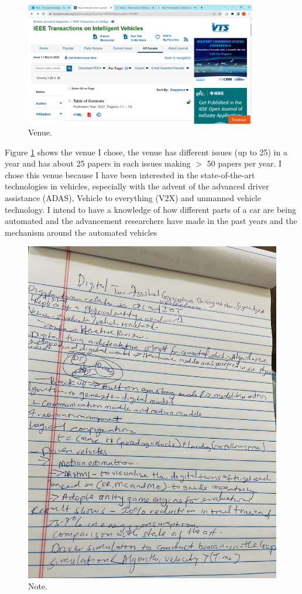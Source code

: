 \documentclass{article}
\begin{document}
\begin{figure}[htbp]
  \centering
  \includegraphics[width=0.9\textwidth]{Screenshot (280).png}
  \caption{Venue.}
  \label{fig:venue}
  \end{figure}
Figure \ref{fig:venue} shows the venue \cite{conference} I chose, the venue has different issues (up to 25) in a year and has about 25 papers in each issues making $>$ 50 papers per year. I chose this venue because I have been interested in the state-of-the-art technologies in vehicles, especially with the advent of the advanced driver assistance (ADAS), Vehicle to everything (V2X) and unmanned vehicle technology. I intend to have a knowledge of how different parts of a car are being automated and the advancement researchers have made in the past years and the mechanism around the automated vehicles 
\cite{9761719}

\begin{figure}[t!]
  \centering
  \includegraphics[width=1\textwidth]{IMG-8416.jpg}
  \caption{Note.}
  \label{fig:digital}
  \end{figure}
  
\end{document}
